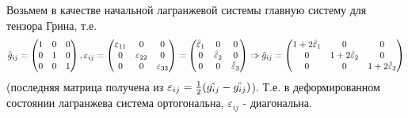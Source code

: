 Возьмем в качестве начальной лагранжевой системы главную систему для тензора Грина, т.е.
$$
  \accentset{\circ}{g}_{ij} =
  \begin{pmatrix}
    1 & 0 & 0 \\
    0 & 1 & 0 \\
    0 & 0 & 1
  \end{pmatrix},
  \varepsilon_{ij} =
  \begin{pmatrix}
    \varepsilon_{11} & 0                & 0                \\
    0                & \varepsilon_{22} & 0                \\
    0                & 0                & \varepsilon_{33}
  \end{pmatrix} =
  \begin{pmatrix}
    \accentset{\circ}{\varepsilon}_{1} & 0                      & 0                      \\
    0                      & \accentset{\circ}{\varepsilon}_{2} & 0                      \\
    0                      & 0                      & \accentset{\circ}{\varepsilon}_{3}
  \end{pmatrix}
  \Rightarrow
  \hat g_{ij} =
  \begin{pmatrix}
    1+2\accentset{\circ}{\varepsilon}_{1} & 0                         & 0                         \\
    0                         & 1+2\accentset{\circ}{\varepsilon}_{2} & 0                         \\
    0                         & 0                         & 1+2\accentset{\circ}{\varepsilon}_{3}
  \end{pmatrix}
$$
(последняя матрица получена из $\varepsilon_{ij} = \frac{1}{2}(\hat{g_{ij}} - \accentset{\circ}{g_{ij}})$). Т.е. в деформированном состоянии лагранжева система ортогональна, $\varepsilon_{ij}$ - диагональна.

